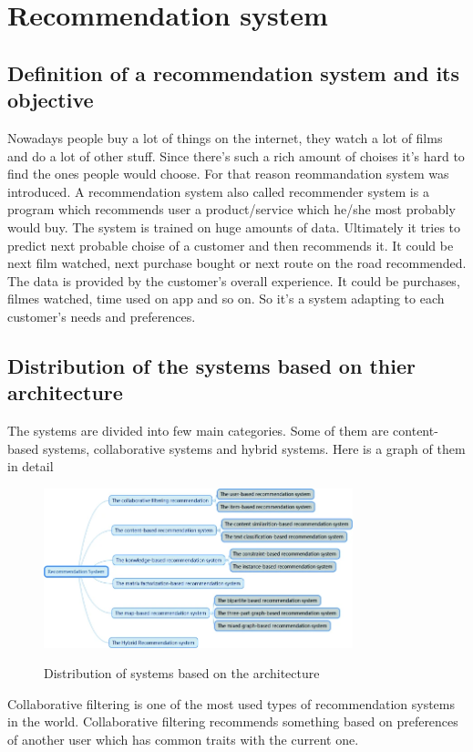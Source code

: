 \documentclass[10pt,twoside,english,a4paper]{article}
\begin{document}
\tableofcontents
\newpage










\section{Recommendation system}

\subsection{Definition of a recommendation system and its objective}
Nowadays people buy a lot of things on the internet, they watch a lot of films and do a lot of other stuff. Since there's such a rich amount of choises it's hard to find the ones people would choose. For that reason reommandation system was introduced. A recommendation system also called recommender system is a program which recommends user a product/service which he/she most probably would buy. The system is trained on huge amounts of data. Ultimately it tries to predict next probable choise of a customer and then recommends it. It could be next film watched, next purchase bought or next route on the road recommended. The data is provided by the customer's overall experience. It could be purchases, filmes watched, time used on app and so on. So it's a system adapting to each customer's needs and preferences.\cite{vars_rec_sys}

\subsection{Distribution of the systems based on thier architecture}
The systems are divided into few main categories. Some of them are content-based systems, collaborative systems and hybrid systems. Here is a graph of them in detail
\begin{figure}[h]
\centering
\includegraphics[width=0.8\textwidth]{system_vars}
\caption{Distribution of systems based on the architecture}\cite{wang2019review}
\label{fig:System categories}
\end{figure}
\par Collaborative filtering is one of the most used types of recommendation systems in the world. Collaborative filtering recommends something based on preferences of another user which has common traits with the current one. 
\end{document}
